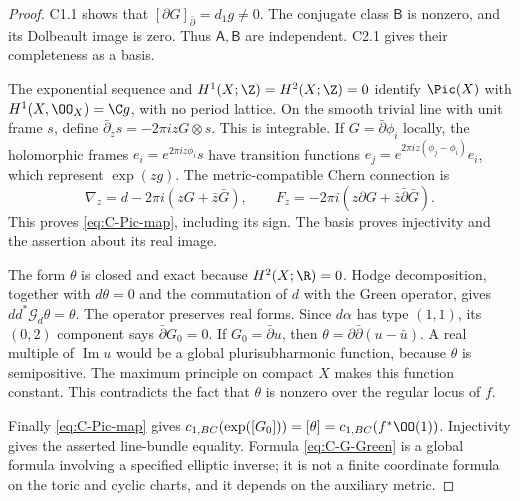 \begin{proof}
C1.1 shows that $[\partial G]_{\bar\partial}=d_1g\ne0$.
The conjugate class $\mathsf B$ is nonzero, and its Dolbeault image
is zero.  Thus $\mathsf A,\mathsf B$ are independent.  C2.1 gives
their completeness as a basis.

The exponential sequence and $H^1(X;\Z)=H^2(X;\Z)=0$ identify
$\Pic(X)$ with $H^1(X,\OO_X)=\C g$, with no period lattice.
On the smooth trivial line with unit frame $s$, define
$\bar\partial_zs=-2\pi izG\otimes s$.  This is integrable.
If $G=\bar\partial\phi_i$ locally, the holomorphic frames
$e_i=e^{2\pi iz\phi_i}s$ have transition functions
$e_j=e^{2\pi iz(\phi_j-\phi_i)}e_i$, which represent
$\exp(zg)$.  The metric-compatible Chern connection is
\[
\nabla_z=d-2\pi i(zG+\bar z\bar G),\qquad
F_z=-2\pi i(z\partial G+\bar z\bar\partial\bar G).
\]
This proves \eqref{eq:C-Pic-map}, including its sign.  The basis
proves injectivity and the assertion about its real image.

The form $\theta$ is closed and exact because $H^2(X;\R)=0$.
Hodge decomposition, together with $d\theta=0$ and the commutation
of $d$ with the Green operator, gives $dd^*\mathcal G_d\theta=
\theta$.  The operator preserves real forms.  Since $d\alpha$ has
type $(1,1)$, its $(0,2)$ component says
$\bar\partial G_0=0$.  If $G_0=\bar\partial u$, then
$\theta=\partial\bar\partial(u-\bar u)$.  A real multiple of
$\operatorname{Im}u$ would be a global plurisubharmonic function,
because $\theta$ is semipositive.  The maximum principle on compact
$X$ makes this function constant.  This contradicts the fact that
$\theta$ is nonzero over the regular locus of $f$.

Finally \eqref{eq:C-Pic-map} gives
$c_{1,BC}(\exp([G_0]))=[\theta]=c_{1,BC}(f^*\OO(1))$.
Injectivity gives the asserted line-bundle equality.  Formula
\eqref{eq:C-G-Green} is a global formula involving a specified
elliptic inverse; it is not a finite coordinate formula on the toric
and cyclic charts, and it depends on the auxiliary metric.
\end{proof}
